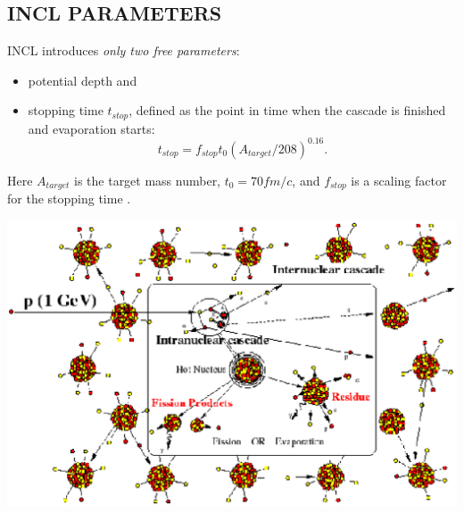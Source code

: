 \documentclass[20pt]{article}
\newenvironment{textbox}
{\begin{lrbox}{\dummybox}\begin{minipage}{0.9\columnwidth}}
{\end{minipage}\end{lrbox}\raisebox{-\depth}{\psshadowbox[framesep=1em,framearc=.1,shadow=true]{\usebox{\dummybox}}}\vspace{0.005\textheight}}
\begin{document}
\begin{center}
\begin{multicols}{3}
\begin{textbox}
\section*{{\Huge {\sf INCL PARAMETERS}}}

INCL introduces \emph{only two free parameters}:
\begin{itemize}
\item potential depth and
\item stopping time
$t_{stop}$, defined as the point in time when the cascade is
finished and evaporation starts:
\begin{equation}
t_{stop} = f_{stop}t_0 (A_{target}/208) ^{0.16}.
\end{equation}
\end{itemize}
Here $A_{target}$ is the target mass number, $t_0 = 70 fm/c$, and
$f_{stop}$ is a scaling factor for the stopping time \cite{g4physref}.


\end{textbox}



\includegraphics[scale=0.73]{images/cascade.eps}


\end{multicols}
\end{center}
\end{document}

